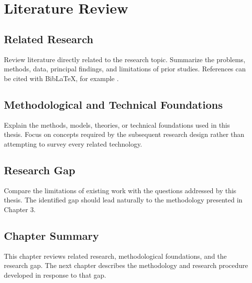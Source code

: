 \chapter{Literature Review}

\section{Related Research}

Review literature directly related to the research topic. Summarize the problems, methods, data, principal findings, and limitations of prior studies. References can be cited with BibLaTeX, for example \cite{lamport1994latex}.

\section{Methodological and Technical Foundations}

Explain the methods, models, theories, or technical foundations used in this thesis. Focus on concepts required by the subsequent research design rather than attempting to survey every related technology.

\section{Research Gap}

Compare the limitations of existing work with the questions addressed by this thesis. The identified gap should lead naturally to the methodology presented in Chapter 3.

\section{Chapter Summary}

This chapter reviews related research, methodological foundations, and the research gap. The next chapter describes the methodology and research procedure developed in response to that gap.
